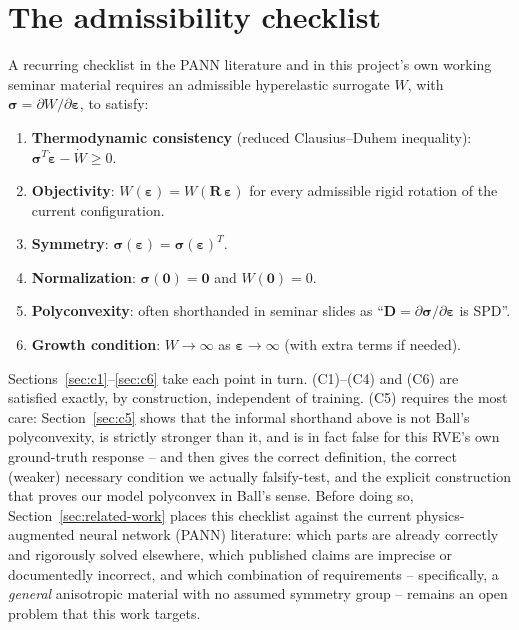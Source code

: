\documentclass[10pt,a4paper]{article}
\begin{document}
\section{The admissibility checklist}
\label{sec:checklist}
A recurring checklist in the PANN literature and in this project's own
working seminar material requires an admissible hyperelastic surrogate
$W$, with $\bm\sigma=\partial W/\partial\bm\varepsilon$, to satisfy:
\begin{enumerate}
 \item[\textbf{(C1)}] \textbf{Thermodynamic consistency} (reduced
 Clausius--Duhem inequality): $\bm\sigma^T\dot{\bm\varepsilon}-\dot W\geq0$.
 \item[\textbf{(C2)}] \textbf{Objectivity}: $W(\bm\varepsilon)=W(\bm
 R\,\bm\varepsilon)$ for every admissible rigid rotation of the current
 configuration.
 \item[\textbf{(C3)}] \textbf{Symmetry}: $\bm\sigma(\bm\varepsilon)=
 \bm\sigma(\bm\varepsilon)^T$.
 \item[\textbf{(C4)}] \textbf{Normalization}: $\bm\sigma(\bm 0)=\bm0$ and
 $W(\bm0)=0$.
 \item[\textbf{(C5)}] \textbf{Polyconvexity}: often shorthanded in seminar
 slides as ``$\bm D=\partial\bm\sigma/\partial\bm\varepsilon$ is SPD''.
 \item[\textbf{(C6)}] \textbf{Growth condition}: $W\to\infty$ as
 $\bm\varepsilon\to\infty$ (with extra terms if needed).
\end{enumerate}
Sections~\ref{sec:c1}--\ref{sec:c6} take each point in turn.  (C1)--(C4)
and (C6) are satisfied exactly, by construction, independent of training.
(C5) requires the most care: Section~\ref{sec:c5} shows that the informal
shorthand above is not Ball's polyconvexity, is strictly stronger than it,
and is in fact false for this RVE's own ground-truth response -- and then
gives the correct definition, the correct (weaker) necessary condition we
actually falsify-test, and the explicit construction that proves our model
polyconvex in Ball's sense.  Before doing so, Section~\ref{sec:related-work}
places this checklist against the current physics-augmented neural network
(PANN) literature: which parts are already correctly and rigorously solved
elsewhere, which published claims are imprecise or documentedly incorrect,
and which combination of requirements -- specifically, a \emph{general}
anisotropic material with no assumed symmetry group -- remains an open
problem that this work targets.
\end{document}
